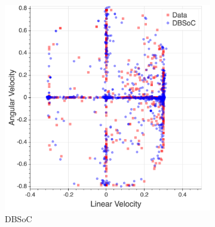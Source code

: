 \documentclass[letterpaper, 10 pt, conference]{ieeeconf}
\begin{document}
  	\begin{figure}[tbh]
      \begin{subfigure}[b]{0.45\columnwidth}

    \includegraphics[scale = 0.08]{images/full_dist.png}
    \caption{DBSoC}
    \label{fig:data1}
  \end{subfigure}
    	\hspace{5mm}
  \begin{subfigure}[b]{0.45\columnwidth}


\end{subfigure}
\end{figure}
\end{document}
